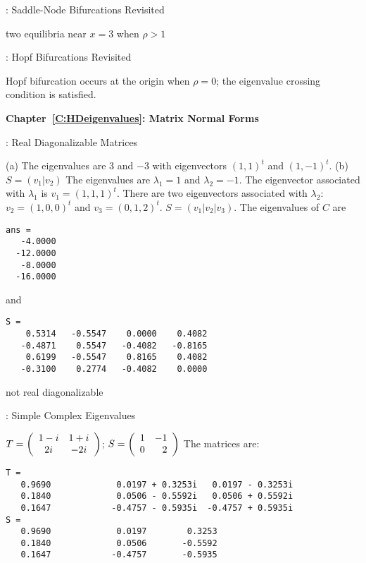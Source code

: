 : Saddle-Node Bifurcations Revisited


 \ans two equilibria near $x = 3$ when $\rho > 1$

: Hopf Bifurcations Revisited

\ans Hopf bifurcation occurs at the origin when $\rho=0$; the eigenvalue 
crossing condition is satisfied.


\vspace{0.08in}
{\bf Chapter~\ref{C:HDeigenvalues}: Matrix Normal Forms}

: Real Diagonalizable Matrices


(a) The eigenvalues are $3$ and $-3$ with eigenvectors $(1,1)^t$ and $(1,-1)^t$.
(b) $S = (v_1|v_2)$
 The eigenvalues are $\lambda_1 = 1$ and $\lambda_2 = -1$.  
The eigenvector associated with $\lambda_1$ is $v_1 = (1,1,1)^t$.  There 
are two eigenvectors associated with $\lambda_2$: $v_2 = (1,0,0)^t$ 
and $v_3 = (0,1,2)^t$. $S = (v_1|v_2|v_3)$.
The eigenvalues of $C$ are
\begin{verbatim}
ans =
   -4.0000
  -12.0000
   -8.0000
  -16.0000
\end{verbatim}
and
\begin{verbatim}
S =
    0.5314   -0.5547    0.0000    0.4082
   -0.4871    0.5547   -0.4082   -0.8165
    0.6199   -0.5547    0.8165    0.4082
   -0.3100    0.2774   -0.4082    0.0000
\end{verbatim}

\ans not real diagonalizable



: Simple Complex Eigenvalues

\ans $T = \left(\begin{array}{cc} 1 - i & 1 + i\\ 2i &-2i\end{array}\right)$; $S = \left(\begin{array}{rr} 1 & -1\\ 0 &2\end{array}\right)$
\ans The matrices are:
\begin{verbatim}
T =
   0.9690             0.0197 + 0.3253i   0.0197 - 0.3253i
   0.1840             0.0506 - 0.5592i   0.0506 + 0.5592i
   0.1647            -0.4757 - 0.5935i  -0.4757 + 0.5935i
S =
   0.9690             0.0197        0.3253   
   0.1840             0.0506       -0.5592 
   0.1647            -0.4757       -0.5935 
\end{verbatim}

